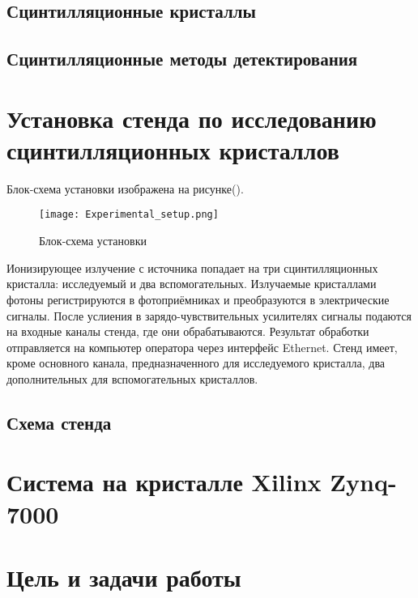 \documentclass[a4paper, 14pt]{extarticle}
\begin{document}
    \subsection{Сцинтилляционные кристаллы}
    
    \subsection{Сцинтилляционные методы детектирования}
    \newpage

\section{Установка стенда по исследованию сцинтилляционных кристаллов}
    Блок-схема установки изображена на рисунке().\par
    \begin{figure}[ht]
        \centering
        \texttt{[image: Experimental\_setup.png]}
        \caption{Блок-схема установки}
        \label{fig:mpr}
    \end{figure}
    Ионизирующее излучение с источника попадает на три сцинтилляционных кристалла: исследуемый и два вспомогательных. Излучаемые кристаллами фотоны регистрируются в фотоприёмниках и преобразуются в электрические сигналы. После услиения в зарядо-чувствительных усилителях сигналы подаются на входные каналы стенда, где они обрабатываются. Результат обработки отправляется на компьютер оператора через интерфейс Ethernet. Стенд имеет, кроме основного канала, предназначенного для исследуемого кристалла, два дополнительных для вспомогательных кристаллов.
    
    \subsection{Схема стенда}
    \newpage

\section{Система на кристалле Xilinx Zynq-7000}
    \newpage
    
\section{Цель и задачи работы}
    \newpage
    
\end{document}
